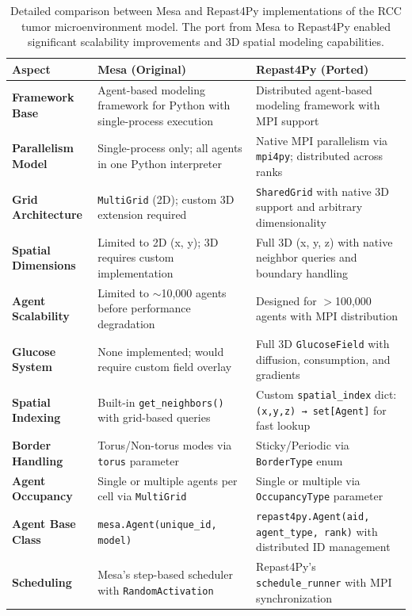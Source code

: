 \begin{table}[H]
\centering
\caption{Detailed comparison between Mesa and Repast4Py implementations of the RCC tumor microenvironment model. The port from Mesa to Repast4Py enabled significant scalability improvements and 3D spatial modeling capabilities.}
\label{tab:detailed-mesa-vs-repast4py}
\begin{tabular}{@{}p{3.5cm}p{5cm}p{5cm}@{}}
\toprule
\textbf{Aspect} & \textbf{Mesa (Original)} & \textbf{Repast4Py (Ported)} \\
\midrule
\textbf{Framework Base} & Agent-based modeling framework for Python with single-process execution & Distributed agent-based modeling framework with MPI support \\
\midrule
\textbf{Parallelism Model} & Single-process only; all agents in one Python interpreter & Native MPI parallelism via \texttt{mpi4py}; distributed across ranks \\
\midrule
\textbf{Grid Architecture} & \texttt{MultiGrid} (2D); custom 3D extension required & \texttt{SharedGrid} with native 3D support and arbitrary dimensionality \\
\midrule
\textbf{Spatial Dimensions} & Limited to 2D (x, y); 3D requires custom implementation & Full 3D (x, y, z) with native neighbor queries and boundary handling \\
\midrule
\textbf{Agent Scalability} & Limited to $\sim$10,000 agents before performance degradation & Designed for $>$100,000 agents with MPI distribution \\
\midrule
\textbf{Glucose System} & None implemented; would require custom field overlay & Full 3D \texttt{GlucoseField} with diffusion, consumption, and gradients \\
\midrule
\textbf{Spatial Indexing} & Built-in \texttt{get\_neighbors()} with grid-based queries & Custom \texttt{spatial\_index} dict: \texttt{(x,y,z) → set[Agent]} for fast lookup \\
\midrule
\textbf{Border Handling} & Torus/Non-torus modes via \texttt{torus} parameter & Sticky/Periodic via \texttt{BorderType} enum \\
\midrule
\textbf{Agent Occupancy} & Single or multiple agents per cell via \texttt{MultiGrid} & Single or multiple via \texttt{OccupancyType} parameter \\
\midrule
\textbf{Agent Base Class} & \texttt{mesa.Agent(unique\_id, model)} & \texttt{repast4py.Agent(aid, agent\_type, rank)} with distributed ID management \\
\midrule
\textbf{Scheduling} & Mesa's step-based scheduler with \texttt{RandomActivation} & Repast4Py's \texttt{schedule\_runner} with MPI synchronization \\

\end{tabular}
\end{table}
